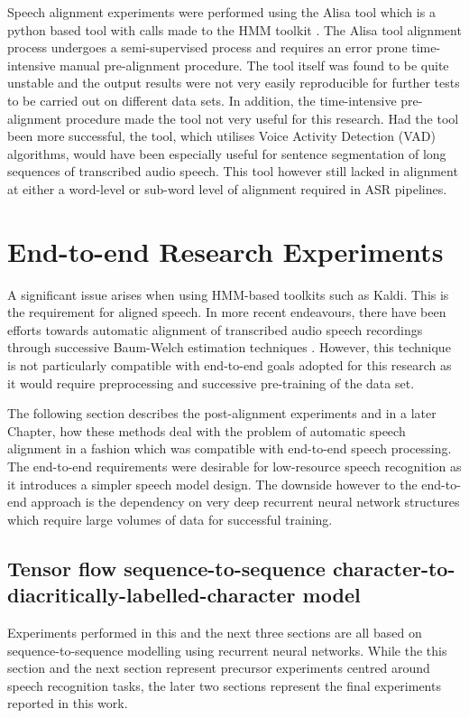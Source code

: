 Speech alignment experiments were performed using the Alisa \cite{stan2016alisa} tool which is a python based tool with calls made to the HMM toolkit \cite{young2002htk}.  The Alisa tool alignment process undergoes a semi-supervised process and requires an error prone time-intensive manual pre-alignment procedure.  The tool itself was found to be quite unstable and the output results were not very easily reproducible for further tests to be carried out on different data sets.  In addition, the time-intensive pre-alignment procedure made the tool not very useful for this research. Had the tool been more successful, the tool, which utilises Voice Activity Detection (VAD) algorithms, would have been especially useful for sentence segmentation of long sequences of transcribed audio speech.  This tool however still lacked in alignment at either a word-level or sub-word level of alignment required in ASR pipelines.

\section{End-to-end Research Experiments}\label{sec_postalign}
A significant issue arises when using HMM-based toolkits such as Kaldi.  This is the requirement for aligned speech.  In more recent endeavours, there have been efforts towards automatic alignment of transcribed audio speech recordings through successive Baum-Welch estimation techniques \cite{gales2014speech,ragni2018automatic,ragni2014data}. However, this technique is not particularly compatible with end-to-end goals adopted for this research as it would require preprocessing and successive pre-training of the data set.

The following section describes the post-alignment experiments and in a later Chapter, how these methods deal with the problem of automatic speech alignment in a fashion which was compatible with end-to-end speech processing.  The end-to-end requirements were desirable for low-resource speech recognition as it introduces a simpler speech model design.  The downside however to the end-to-end approach is the dependency on very deep recurrent neural network structures which require large volumes of data for successful training.

\subsection{Tensor flow sequence-to-sequence character-to-diacritically-labelled-character model}\label{sec_c2d}
Experiments performed in this and the next three sections are all based on sequence-to-sequence modelling using recurrent neural networks.  While the this section and the next section represent precursor experiments centred around speech recognition tasks, the later two sections represent the final experiments reported in this work.

